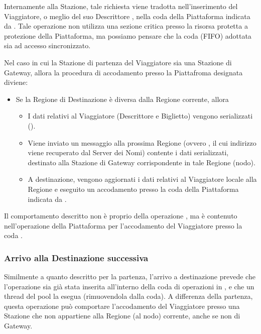 	Internamente alla Stazione, tale richiesta viene tradotta nell'inserimento del Viaggiatore, o meglio del suo Descrittore , nella coda  della Piattaforma indicata da . Tale operazione non utilizza una sezione critica presso la risorsa protetta a protezione della Piattaforma, ma possiamo pensare che la coda (FIFO) adottata sia ad accesso sincronizzato.
	
	Nel caso in cui la Stazione di partenza del Viaggiatore sia una Stazione di Gateway, allora la procedura di accodamento presso la Piattafroma designata diviene:
	\begin{itemize}
		\item Se la Regione di Destinazione  è diversa dalla Regione corrente, allora
			\begin{itemize}
				\item I dati relativi al Viaggiatore (Descrittore e Biglietto) vengono serializzati ().
				\item Viene inviato un messaggio alla prossima Regione (ovvero , il cui indirizzo viene recuperato dal Server dei Nomi) contente i dati serializzati, destinato alla Stazione di Gateway corrispondente in tale Regione (nodo).
				\item A destinazione, vengono aggiornati i dati relativi al Viaggiatore locale alla Regione e eseguito un accodamento presso la coda  della Piattaforma indicata da .
			\end{itemize}
	\end{itemize}
	
	Il comportamento descritto non è proprio della operazione , ma è contenuto nell'operazione della Piattaforma per l'accodamento del Viaggiatore presso la coda . 
	
	
	\subsubsection{Arrivo alla Destinazione successiva}
		
	Similmente a quanto descritto per la partenza, l'arrivo a destinazione prevede che l'operazione  sia già stata inserita all'interno della coda di operazioni in , e che un thread del pool la esegua (rimuovendola dalla coda). A differenza della partenza, questa operazione può comportare l'accodamento del Viaggiatore presso una Stazione che non appartiene alla Regione (al nodo) corrente, anche se non di Gateway. 
	
